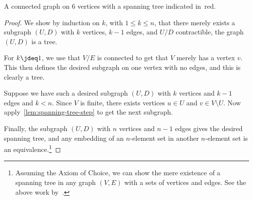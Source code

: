 \begin{marginfigure}
  \caption{A connected graph on $6$ vertices with a spanning tree indicated
    in~\textcolor{casred}{red}.}
  \label{fig:spanning-tree-example}
\end{marginfigure}

\begin{proof}
  We show by induction on $k$, with $1\le k\le n$, that there merely exists
  a subgraph $(U,D)$ with $k$ vertices, $k-1$ edges, and $U/D$ contractible,
  \ie the graph $(U,D)$ is a tree.

  For $k\jdeq 1$, we use that $V/E$ is connected to get that $V$ merely has a vertex $v$.
  This then defines the desired subgraph on one vertex with no edges,
  and this is clearly a tree.

  Suppose we have such a desired subgraph $(U,D)$
  with $k$ vertices and $k-1$ edges and $k<n$.
  Since $V$ is finite, there exists vertices $u \in U$ and $v \in V \setminus U$.
  Now apply~\cref{lem:spanning-tree-step} to get the next subgraph.

  Finally, the subgraph $(U,D)$ with $n$ vertices and $n-1$ edges gives
  the desired spanning tree, and any embedding of an $n$-element set
  in another $n$-element set is an equivalence.\footnote{%
    Assuming the Axiom of Choice, we can show the mere existence of a spanning tree
    in any graph $(V,E)$ with a sets of vertices and edges.
    See the above work by~\citeauthor{Swan2022}.}
\end{proof}

